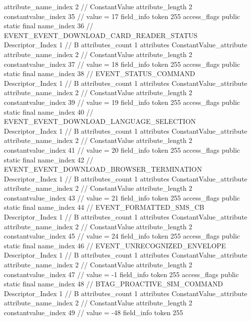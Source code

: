 {{{{{{{					attribute_name_index	2		// ConstantValue
					attribute_length	2
					constantvalue_index	35		// value = 17
				}
				}
			}
			field_info {
				token	255
				access_flags	public static final
				name_index	36		// EVENT_EVENT_DOWNLOAD_CARD_READER_STATUS
				Descriptor_Index	1		// B
				attributes_count	1
				attributes {
				ConstantValue_attribute {
					attribute_name_index	2		// ConstantValue
					attribute_length	2
					constantvalue_index	37		// value = 18
				}
				}
			}
			field_info {
				token	255
				access_flags	public static final
				name_index	38		// EVENT_STATUS_COMMAND
				Descriptor_Index	1		// B
				attributes_count	1
				attributes {
				ConstantValue_attribute {
					attribute_name_index	2		// ConstantValue
					attribute_length	2
					constantvalue_index	39		// value = 19
				}
				}
			}
			field_info {
				token	255
				access_flags	public static final
				name_index	40		// EVENT_EVENT_DOWNLOAD_LANGUAGE_SELECTION
				Descriptor_Index	1		// B
				attributes_count	1
				attributes {
				ConstantValue_attribute {
					attribute_name_index	2		// ConstantValue
					attribute_length	2
					constantvalue_index	41		// value = 20
				}
				}
			}
			field_info {
				token	255
				access_flags	public static final
				name_index	42		// EVENT_EVENT_DOWNLOAD_BROWSER_TERMINATION
				Descriptor_Index	1		// B
				attributes_count	1
				attributes {
				ConstantValue_attribute {
					attribute_name_index	2		// ConstantValue
					attribute_length	2
					constantvalue_index	43		// value = 21
				}
				}
			}
			field_info {
				token	255
				access_flags	public static final
				name_index	44		// EVENT_FORMATTED_SMS_CB
				Descriptor_Index	1		// B
				attributes_count	1
				attributes {
				ConstantValue_attribute {
					attribute_name_index	2		// ConstantValue
					attribute_length	2
					constantvalue_index	45		// value = 24
				}
				}
			}
			field_info {
				token	255
				access_flags	public static final
				name_index	46		// EVENT_UNRECOGNIZED_ENVELOPE
				Descriptor_Index	1		// B
				attributes_count	1
				attributes {
				ConstantValue_attribute {
					attribute_name_index	2		// ConstantValue
					attribute_length	2
					constantvalue_index	47		// value = -1
				}
				}
			}
			field_info {
				token	255
				access_flags	public static final
				name_index	48		// BTAG_PROACTIVE_SIM_COMMAND
				Descriptor_Index	1		// B
				attributes_count	1
				attributes {
				ConstantValue_attribute {
					attribute_name_index	2		// ConstantValue
					attribute_length	2
					constantvalue_index	49		// value = -48
				}
				}
			}
			field_info {
				token	255
}}}}}

